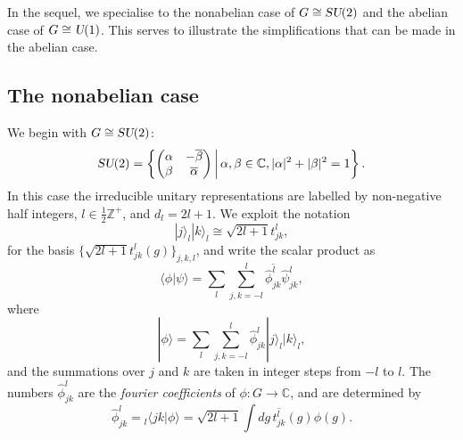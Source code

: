 \documentclass[12pt]{amsart}
\def\su2{\textsl{SU}(2)}
\def\uone{\textsl{U}(1)}
\theoremstyle{definition}
\theoremstyle{remark}
\numberwithin{equation}{section}
\begin{document}
In the sequel, we specialise to the nonabelian case of $G \cong \su2$
and the abelian case of $G \cong \uone$. This serves to illustrate the simplifications
that can be made in the abelian case.

\subsection{The nonabelian case}
We begin with $G\cong \su2$:
\begin{equation}
	\su2 = \left\{\begin{pmatrix} \alpha & -\overline{\beta} \\ \beta & \overline{\alpha}\end{pmatrix}\,\middle|\, \alpha,\beta\in \mathbb{C}, |\alpha|^2+|\beta|^2 = 1\right\}.
\end{equation}
In this case the irreducible unitary representations are labelled by non-negative half integers, $l \in \frac12\mathbb{Z}^+$, and $d_l = 2l+1$.
We exploit the notation
\begin{equation}
	|j\rangle_l|k\rangle_l \cong \sqrt{2l+1} t_{jk}^l,
\end{equation}
for the basis $\{\sqrt{2l+1} t_{jk}^l(g)\}_{j,k,l}$, and write the scalar product as
\begin{equation}
	\langle \phi|\psi\rangle = \sum_{l}\sum_{j,k = -l}^l \overline{\widehat{\phi}_{jk}^l}\widehat{\psi}_{jk}^l,
\end{equation}
where 
\begin{equation}
	|\phi\rangle = \sum_{l}\sum_{j,k=-l}^l\widehat{\phi}_{jk}^l |j\rangle_l|k\rangle_l,
\end{equation}
and the summations over $j$ and $k$ are taken in integer steps from $-l$ to $l$. The numbers $\widehat{\phi}_{jk}^l$ are the \emph{fourier coefficients} of $\phi:G\rightarrow \mathbb{C}$, and are determined by
\begin{equation}
	\widehat{\phi}_{jk}^l = {_l\langle jk|\phi\rangle} = \sqrt{2l+1}\int dg \, \overline{t^l_{jk}}(g) \phi(g).
\end{equation}
\end{document}
